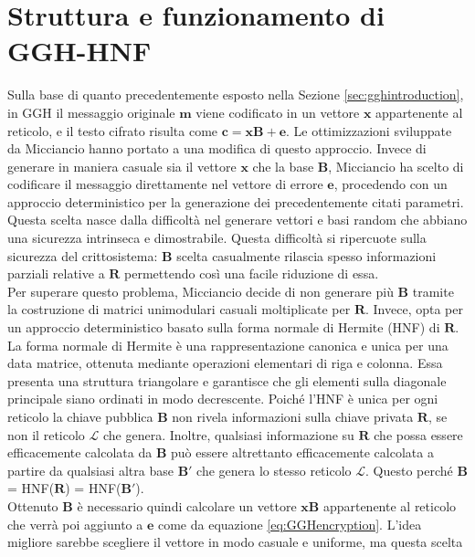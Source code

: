 \section{Struttura e funzionamento di GGH-HNF}
\label{sec:ggh-hnf}
Sulla base di quanto precedentemente esposto nella Sezione \ref{sec:gghintroduction}, in GGH
il messaggio originale $\mathbf{m}$ viene codificato in un vettore $\mathbf{x}$ 
appartenente al reticolo, e il testo cifrato risulta come 
$\mathbf{c} = \mathbf{x}\mathbf{B} + \mathbf{e}$.
Le ottimizzazioni sviluppate da Micciancio hanno portato a una modifica di questo approccio. 
Invece di generare in maniera casuale sia il vettore $\mathbf{x}$ che la base $\mathbf{B}$, 
Micciancio ha scelto di codificare il messaggio direttamente nel vettore di errore $\mathbf{e}$, 
procedendo con un approccio deterministico per la generazione dei precedentemente citati parametri.
Questa scelta nasce dalla difficoltà nel generare vettori e basi random che abbiano una 
sicurezza intrinseca e dimostrabile. Questa difficoltà si ripercuote sulla sicurezza del 
crittosistema: $\mathbf{B}$ scelta casualmente rilascia spesso informazioni parziali
relative a $\mathbf{R}$ permettendo così una facile riduzione di essa. \\
Per superare questo problema, Micciancio decide di non generare più $\mathbf{B}$ tramite 
la costruzione di matrici unimodulari casuali moltiplicate per $\mathbf{R}$. 
Invece, opta per un approccio deterministico basato sulla forma normale di Hermite (HNF)
di $\mathbf{R}$. La forma normale di Hermite è una rappresentazione canonica e unica per 
una data matrice, ottenuta mediante operazioni elementari di riga e colonna. 
Essa presenta una struttura triangolare e garantisce che gli elementi sulla diagonale principale 
siano ordinati in modo decrescente.
Poiché l'HNF è unica per ogni reticolo la chiave pubblica $\mathbf{B}$ non rivela informazioni 
sulla chiave privata $\mathbf{R}$, se non il reticolo $\mathcal{L}$ che genera.
Inoltre, qualsiasi informazione su $\mathbf{R}$ che possa essere efficacemente calcolata 
da $\mathbf{B}$ può 
essere altrettanto efficacemente calcolata a partire da qualsiasi altra base $\mathbf{B}'$ 
che genera lo stesso reticolo $\mathcal{L}$. Questo perché 
$\mathbf{B}$ = HNF($\mathbf{R}$) = HNF($\mathbf{B}'$). \\
Ottenuto $\mathbf{B}$ è necessario quindi calcolare un vettore
$\mathbf{x}\mathbf{B}$ appartenente al reticolo che verrà poi aggiunto a $\mathbf{e}$ come
da equazione \ref{eq:GGHencryption}.  
L'idea migliore sarebbe scegliere il vettore in modo casuale e uniforme, ma questa scelta 
